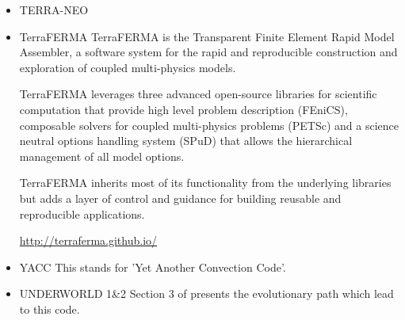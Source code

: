 \begin{itemize}
{\small
\noindent
\cite{baum83}
\cite{buri96}
\cite{glat88}
\cite{tasg93}
\cite{tasg94}
\cite{buba95}
\cite{burb97}\cite{yang97}
\cite{burl98}
\cite{tabg99}
\cite{phbs09}\cite{wodd09}\cite{gows09}
\cite{yayh10}
\cite{woda11}\cite{iahb11}
\cite{dagd12}\cite{shbs12}
\cite{dadb13}
\cite{vade16}
\cite{woda17}
\cite{ghbu18}
}

\item {\codefont TERRA-NEO} 

\cite{wegg15}


\item {\codefont TerraFERMA} 
TerraFERMA is the Transparent Finite Element Rapid Model Assembler, a software system for the rapid and reproducible construction and exploration of coupled multi-physics models.

TerraFERMA leverages three advanced open-source libraries for scientific computation that provide high level problem description (FEniCS), composable solvers for coupled multi-physics problems (PETSc) and a science neutral options handling system (SPuD) that allows the hierarchical management of all model options.

TerraFERMA inherits most of its functionality from the underlying libraries but adds a layer of control and guidance for building reusable and reproducible applications.

\url{http://terraferma.github.io/}

{\small
\noindent
\cite{wisv14}
\cite{wisv17}
\cite{spmw16}
\cite{ceww17}
\cite{ceww19}
}

\item {\codefont YACC} 
This stands for 'Yet Another Convection Code'.

{\small
\noindent
\cite{sato12}
\cite{toyd13}
\cite{tosn15}
\cite{tomy16}
}

\item {\codefont UNDERWORLD 1\&2} 
Section 3 of \cite{qums07} presents the evolutionary path which lead to this code.


\end{itemize}
